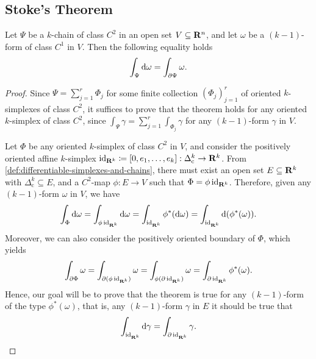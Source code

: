 \subsection{Stoke's Theorem}

\begin{theorem}[Stoke's]
    \label{thm:stokes}
    Let \(\Psi\) be a \(k\)-chain of class \(C^2\) in an open set \(V \subseteq
    \mathbf{R}^n\), and let \(\omega\) be a \((k-1)\)-form of class \(C^1\) in \(V\). Then
    the following equality holds
    \[
        \int_{\Psi} \mathrm{d} \omega = \int_{\partial \Psi} \omega.
    \]
\end{theorem}

\begin{proof}
    Since \(\Psi = \sum_{j=1}^r \Phi_j\) for some finite collection
    \((\Phi_j)_{j=1}^r\) of oriented \(k\)-simplexes of class \(C^2\), it suffices
    to prove that the theorem holds for any oriented \(k\)-simplex of class \(C^2\),
    since \(\int_{\Psi} \gamma = \sum_{j=1}^r \int_{\Phi_j} \gamma\) for any
    \((k-1)\)-form \(\gamma\) in \(V\).

    Let \(\Phi\) be any oriented \(k\)-simplex of class \(C^2\) in \(V\), and
    consider the positively oriented affine \(k\)-simplex \(\operatorname{id}_{\mathbf{R}^k} \coloneq [0,
        e_1, \dots, e_k]: \Delta_{\text{c}}^k \to \mathbf{R}^k\). From
    \cref{def:differentiable-simplexes-and-chains}, there must exist an open set \(E
    \subseteq \mathbf{R}^k\) with \(\Delta_{\text{c}}^k \subseteq E\), and a \(C^2\)-map
    \(\phi: E \to V\) such that \(\Phi = \phi \operatorname{id}_{\mathbf{R}^k}\). Therefore, given any
    \((k-1)\)-form \(\omega\) in \(V\), we have
    \[
        \int_{\Phi} \mathrm{d} \omega
        = \int_{\phi \operatorname{id}_{\mathbf{R}^k}} \mathrm{d} \omega
        = \int_{\operatorname{id}_{\mathbf{R}^k}} \phi^{*}(\mathrm{d} \omega)
        = \int_{\operatorname{id}_{\mathbf{R}^k}} \mathrm{d} (\phi^{*} (\omega)).
    \]
    Moreover, we can also consider the positively oriented boundary of \(\Phi\),
    which yields
    \[
        \int_{\partial \Phi} \omega
        = \int_{\partial(\phi \operatorname{id}_{\mathbf{R}^k})} \omega
        = \int_{\phi(\partial \operatorname{id}_{\mathbf{R}^k})} \omega
        = \int_{\partial \operatorname{id}_{\mathbf{R}^k}} \phi^{*}(\omega).
    \]
    Hence, our goal will be to prove that the theorem is true for any \((k-1)\)-form
    of the type \(\phi^{*}(\omega)\), that is, any \((k-1)\)-form \(\gamma\) in
    \(E\) it should be true that
    \begin{equation}
        \label{eq:goal-stokes}
        \int_{\operatorname{id}_{\mathbf{R}^k}} \mathrm{d} \gamma = \int_{\partial \operatorname{id}_{\mathbf{R}^k}} \gamma.
    \end{equation}


\end{proof}
